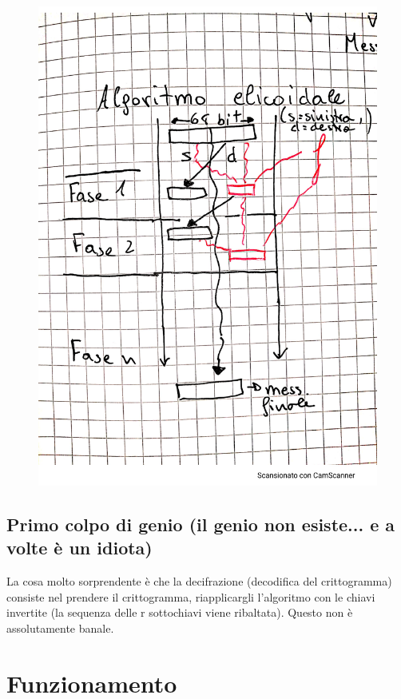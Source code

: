 \begin{figure}[htp]
	\includegraphics[width=\linewidth]{./img/algoritmo_elicoidale.pdf}
	\label{img:algoritmo_elicoidale}
\end{figure}


\subsection{Primo colpo di genio (il genio non esiste... e a volte è un idiota)}
La cosa molto sorprendente è che la decifrazione (decodifica del crittogramma) consiste nel prendere il crittogramma, riapplicargli l'algoritmo con le chiavi invertite (la sequenza delle r sottochiavi viene ribaltata). Questo non è assolutamente banale.

\section{Funzionamento}

